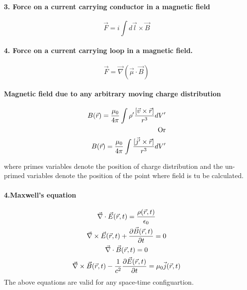 \documentclass[a4paper]{article}
\numberwithin{equation}{subsection}  %
\begin{document}
\paragraph{3. Force on a current carrying conductor in a magnetic  field}
\begin{equation}
\vec{F} = i \int d\vec{l}\times \vec{B}
\end{equation}
\paragraph{4. Force on a current carrying loop in a magnetic field.}
\begin{equation}
 \vec{F} = \vec{\nabla} (\vec{\mu} \cdot \vec{B})
\end{equation}

\paragraph{Magnetic field due to any arbitrary moving charge distribution}

\begin{equation}
\begin{aligned}
B(\vec{r}) = \frac{\mu_0}{4\pi} \int \rho' {[\vec{v}\times \vec{r}] \over {r}^3} dV'\\
\text{Or} \\
B(\vec{r}) = \frac{\mu_0}{4\pi} \int  {[\vec{j'}\times \vec{r}] \over {r}^3} dV'\\
\end{aligned}
\end{equation}

 
where primes variables denote the position of charge distribution and the un-primed variables denote the position of the point where field is tu be calculated.


\paragraph{4.Maxwell's equation}
\begin{gather}
\vec{\nabla} \cdot \vec{E}(\vec{r},t) = {\rho(\vec{r},t) \over \epsilon_0} \\
\vec{\nabla} \times \vec{E }(\vec{r},t)  + \frac{\partial \vec{B}(\vec{r},t) }{\partial t} = 0 \\
\vec{\nabla}\cdot \vec{B} (\vec{r},t)= 0\\
\vec{\nabla}  \times \vec{B}(\vec{r},t) - \frac{1}{c^2}\frac{\partial\vec{E}(\vec{r},t)}{\partial t} =\mu_0 \vec{j} (\vec{r},t)
\end{gather}
The above equations are valid for any space-time configuartion. 
\end{document}
